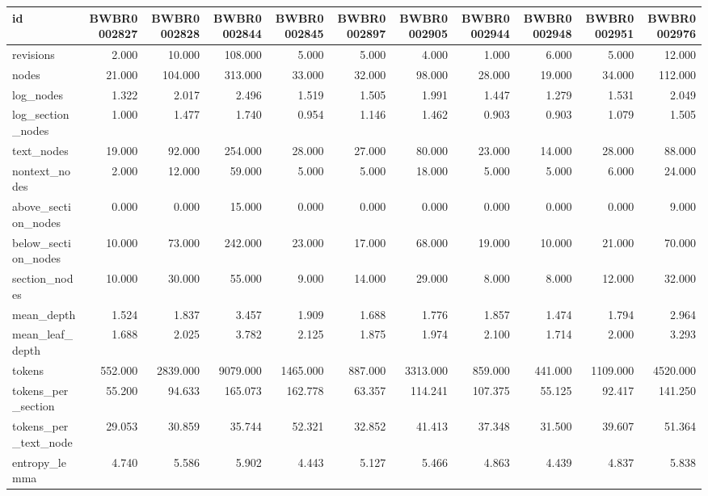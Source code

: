 \begin{tabular}{lrrrrrrrrrr}
\toprule
id & BWBR0002827 & BWBR0002828 & BWBR0002844 & BWBR0002845 & BWBR0002897 & BWBR0002905 & BWBR0002944 & BWBR0002948 & BWBR0002951 & BWBR0002976 \\
\midrule
revisions & 2.000 & 10.000 & 108.000 & 5.000 & 5.000 & 4.000 & 1.000 & 6.000 & 5.000 & 12.000 \\
\cline{1-11}
nodes & 21.000 & 104.000 & 313.000 & 33.000 & 32.000 & 98.000 & 28.000 & 19.000 & 34.000 & 112.000 \\
\cline{1-11}
log\_nodes & 1.322 & 2.017 & 2.496 & 1.519 & 1.505 & 1.991 & 1.447 & 1.279 & 1.531 & 2.049 \\
\cline{1-11}
log\_section\_nodes & 1.000 & 1.477 & 1.740 & 0.954 & 1.146 & 1.462 & 0.903 & 0.903 & 1.079 & 1.505 \\
\cline{1-11}
text\_nodes & 19.000 & 92.000 & 254.000 & 28.000 & 27.000 & 80.000 & 23.000 & 14.000 & 28.000 & 88.000 \\
\cline{1-11}
nontext\_nodes & 2.000 & 12.000 & 59.000 & 5.000 & 5.000 & 18.000 & 5.000 & 5.000 & 6.000 & 24.000 \\
\cline{1-11}
above\_section\_nodes & 0.000 & 0.000 & 15.000 & 0.000 & 0.000 & 0.000 & 0.000 & 0.000 & 0.000 & 9.000 \\
\cline{1-11}
below\_section\_nodes & 10.000 & 73.000 & 242.000 & 23.000 & 17.000 & 68.000 & 19.000 & 10.000 & 21.000 & 70.000 \\
\cline{1-11}
section\_nodes & 10.000 & 30.000 & 55.000 & 9.000 & 14.000 & 29.000 & 8.000 & 8.000 & 12.000 & 32.000 \\
\cline{1-11}
mean\_depth & 1.524 & 1.837 & 3.457 & 1.909 & 1.688 & 1.776 & 1.857 & 1.474 & 1.794 & 2.964 \\
\cline{1-11}
mean\_leaf\_depth & 1.688 & 2.025 & 3.782 & 2.125 & 1.875 & 1.974 & 2.100 & 1.714 & 2.000 & 3.293 \\
\cline{1-11}
tokens & 552.000 & 2839.000 & 9079.000 & 1465.000 & 887.000 & 3313.000 & 859.000 & 441.000 & 1109.000 & 4520.000 \\
\cline{1-11}
tokens\_per\_section & 55.200 & 94.633 & 165.073 & 162.778 & 63.357 & 114.241 & 107.375 & 55.125 & 92.417 & 141.250 \\
\cline{1-11}
tokens\_per\_text\_node & 29.053 & 30.859 & 35.744 & 52.321 & 32.852 & 41.413 & 37.348 & 31.500 & 39.607 & 51.364 \\
\cline{1-11}
entropy\_lemma & 4.740 & 5.586 & 5.902 & 4.443 & 5.127 & 5.466 & 4.863 & 4.439 & 4.837 & 5.838 \\

\end{tabular}
